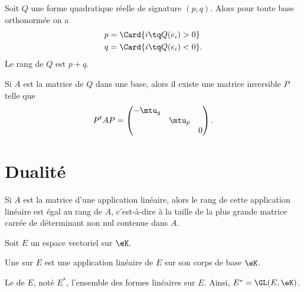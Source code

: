\begin{theorem}[de Sylvester]   \label{ThoQFVsBCk}
    Soit $Q$ une forme quadratique réelle de signature \( (p,q)\). Alors pour toute base orthonormée on a
    \begin{subequations}
        \begin{align}
            p&=\Card\{ i\tq Q(e_i)>0 \}\\
            q&=\Card\{ i\tq Q(e_i)<0 \}.
        \end{align}
    \end{subequations}
    Le rang de \( Q\) est \( p+q\).

    Si \( A\) est la matrice de \( Q\) dans une base, alors il existe une matrice inversible \( P\) telle que
    \begin{equation}
        P^tAP=\begin{pmatrix}
            -\mtu_q    &       &       \\
                &   \mtu_p    &       \\
                &       &   0
        \end{pmatrix}.
    \end{equation}
\end{theorem}

\section{Dualité}

\begin{proposition} \label{PropEJBZooTNFPRj}
    Si \( A\) est la matrice d'une application linéaire, alors le rang de cette application linéaire est égal au rang de \( A \), c'est-à-dire à la taille de la plus grande matrice carrée de déterminant non nul contenue dans \( A\).
\end{proposition}

\begin{definition}  \label{DefJPGSHpn}
    Soit \( E\) un espace vectoriel sur \( \eK\).

    Une  sur \( E \) est une application linéaire de \( E \) sur son corps de base \( \eK\).

    Le  de \( E\), noté \( E^*\), l'ensemble des formes linéaires sur \( E\). Ainsi, \( E^* = \GL(E,\eK)\).
\end{definition}

